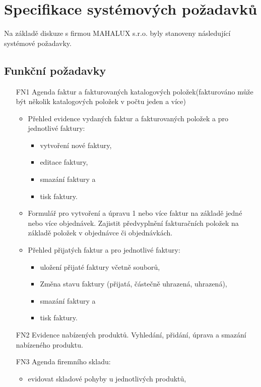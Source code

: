 \documentclass[thesis=B,czech]{FITthesis}[2012/06/26]
\begin{document}
\section{Specifikace systémových požadavků}

	Na základě diskuze s firmou MAHALUX s.r.o. byly stanoveny následující systémové požadavky.
	
\subsection{Funkční požadavky}

\begin{enumerate}
	\item[FN1] Agenda faktur a fakturovaných katalogových položek(fakturováno může být několik katalogových položek v počtu jeden a více)
	\begin{itemize}
		\item Přehled evidence vydaných faktur a fakturovaných položek a pro jednotlivé faktury:
		\begin{itemize}
			\item vytvoření nové faktury,
			\item editace faktury,
			\item smazání faktury a
			\item tisk faktury.
		\end{itemize}
		\item Formulář pro vytvoření a úpravu 1 nebo více faktur na základě jedné nebo více objednávek. Zajistit předvyplnění fakturačních položek na základě položek v objednávce či objednávkách.
		\item Přehled přijatých faktur a pro jednotlivé faktury:
		\begin{itemize}
			\item uložení přijaté faktury včetně souborů,
			\item Změna stavu faktury (přijatá, částečně uhrazená, uhrazená),
			\item smazání faktury a
			\item tisk faktury.
		\end{itemize}
	\end{itemize}	
	\item[FN2] Evidence nabízených produktů.
	 	Vyhledání, přidání, úprava a smazání nabízeného produktu.
	\newpage
	\item[FN3] Agenda firemního skladu:
		\begin{itemize}
			\item evidovat skladové pohyby u jednotlivých produktů,

\end{itemize}
\end{enumerate}
\end{document}
